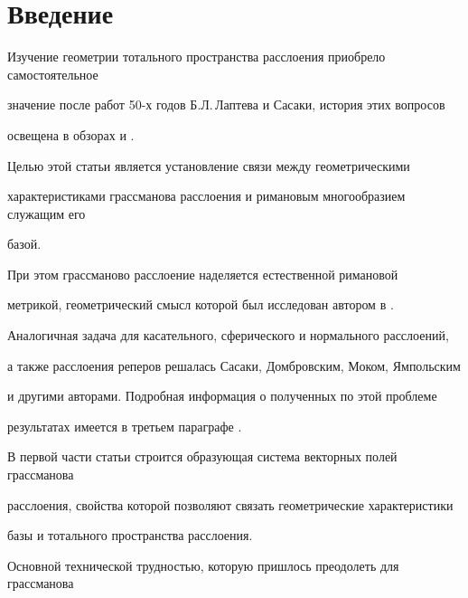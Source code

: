  


 




 


\maketitle 


 




 





\section*{Введение}


Изучение геометрии тотального пространства расслоения приобрело самостоятельное


значение после работ 50-х годов Б.Л.\,Лаптева и Сасаки, история этих вопросов


освещена в обзорах \cite{Shap} и \cite{Bor}.


Целью этой статьи является установление связи между геометрическими


характеристиками грассманова расслоения и римановым многообразием служащим его


базой.


При этом грассманово расслоение наделяется естественной римановой


метрикой, геометрический смысл которой был исследован автором в \cite{Far2}.


Аналогичная задача для касательного, сферического и нормального расслоений,


а также расслоения реперов решалась Сасаки, Домбровским, Моком, Ямпольским


и другими авторами. Подробная информация о полученных по этой проблеме


результатах имеется в третьем параграфе \cite{Bor}.


В первой части статьи строится образующая система векторных полей грассманова


расслоения, свойства которой позволяют связать геометрические характеристики


базы и тотального пространства расслоения.


Основной технической трудностью, которую пришлось преодолеть для грассманова


